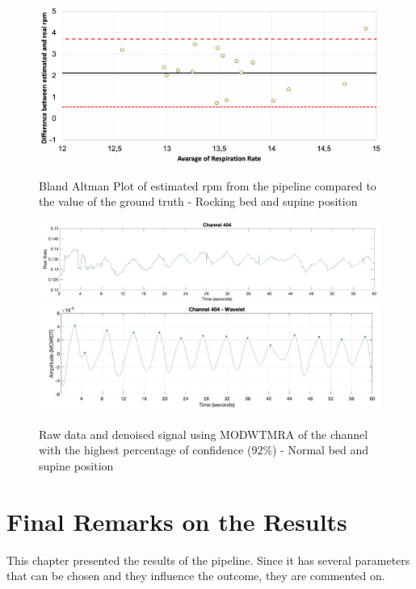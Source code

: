 \begin{figure}[p]
  \centering
  \includegraphics[width=\textwidth]{img/balnd1.pdf}

  \caption{Bland Altman Plot of estimated rpm from the pipeline compared to the value of the ground truth - Rocking bed and supine position}
  \label{fig:baln1}
  \vspace{1.5cm}
  \includegraphics[width=\textwidth]{img/404.jpg}
  \includegraphics[width=\textwidth]{img/404_wave.jpg}
\caption{Raw data and denoised signal using MODWTMRA of the channel with the highest percentage of confidence (92\%) - Normal bed and supine position}
  \label{fig:rec}
\end{figure}






\section{Final Remarks on the Results}

This chapter presented the results of the pipeline. Since it has several parameters that can be chosen and they influence the outcome, they are commented on.

